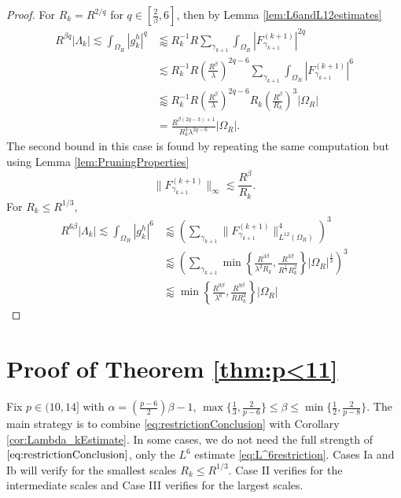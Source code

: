 \documentclass[12pt]{amsart}
\begin{document}
\begin{proof}
For $R_k= R^{2/q}$ for $q\in [\frac{2}{\beta},6]$, then by Lemma \ref{lem:L6andL12estimates}\begin{align*}
    R^{\beta q}|\Lambda_k|\lesssim\int_{\Omega_R}|g_k^h|^q&\lessapprox R_k^{-1}R \sum_{\gamma_{k+1}}\int_{\Omega_R} |F_{\gamma_{k+1}}^{(k+1)}|^{2q}\\
    &\lesssim R_k^{-1}R\left(\frac{R^\beta}{\lambda}\right)^{2q-6}\sum_{\gamma_{k+1}}\int_{\Omega_R}|F_{\gamma_{k+1}}^{(k+1)}|^{6}\\
    &\lessapprox R_k^{-1}R \left(\frac{R^\beta}{\lambda}\right)^{2q-6} R_k\left(\frac{R^{\beta}}{R_k}\right)^3|\Omega_R|\\
    &= \frac{R^{\beta(2q-3)+1}}{R_k^3\lambda^{2q-6}}|\Omega_R|.
\end{align*} The second bound in this case is found by repeating the same computation but using Lemma \ref{lem:PruningProperties} $$\|F_{\gamma_{k+1}}^{(k+1)}\|_\infty \lesssim \frac{R^{\beta}}{R_k}.$$
%
For $R_k\le R^{1/3}$, \begin{align*}
    R^{6\beta}|\Lambda_k|\lesssim\int_{\Omega_R}|g_k^h|^6&\lessapprox \left(\sum_{\gamma_{k+1}}\|F_{\gamma_{k+1}}^{(k+1)}\|_{L^{12}(\Omega_R)}^4\right)^3\\
    &\lessapprox  \left(\sum_{\gamma_{k+1}}\min \left\{\frac{R^{3\beta}}{\lambda^2R_k}, \frac{R^{3\beta}}{R^{\frac{1}{3}}R_k^2}\right\}|\Omega_R|^{\frac{1}{3}}\right)^3\\
    &\lessapprox \min \left\{\frac{R^{9\beta}}{\lambda^6}, \frac{R^{9\beta}}{RR_k^3}\right\}|\Omega_R|
\end{align*}

\end{proof}




\section{Proof of Theorem \ref{thm:p<11}}\label{sec:proof}
Fix $p\in (10, 14]$ with $\alpha = \left(\frac{p-6}{2}\right)\beta-1$, $\max\{\frac{1}{3}, \frac{2}{p-6}\}\le \beta\le \min\{\frac{1}{2},\frac{2}{p-8}\}$. The main strategy is to combine \eqref{eq:restrictionConclusion} with Corollary \ref{cor:Lambda_kEstimate}. In some cases, we do not need the full strength of $\eqref{eq:restrictionConclusion}$, only the $L^6$ estimate \eqref{eq:L^6restriction}. Cases Ia and Ib will verify for the smallest scales $R_k\le R^{1/3}$. Case II verifies for the intermediate scales and Case III verifies for the largest scales. 
\end{document}
